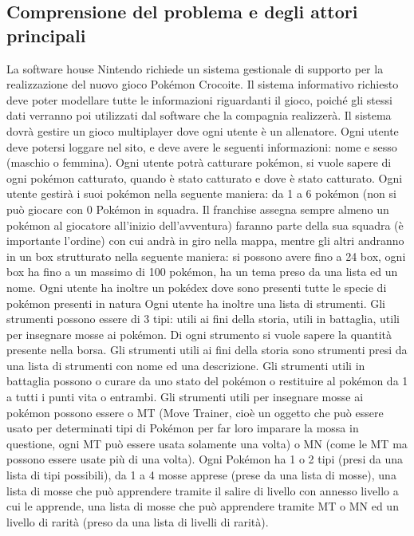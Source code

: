 \documentclass{article}
\begin{document}
\subsection{Comprensione del problema e degli attori principali}
La software house Nintendo richiede un sistema gestionale di supporto per la realizzazione del nuovo gioco Pokémon Crocoite. 
Il sistema informativo richiesto deve poter modellare tutte le informazioni riguardanti il gioco, poiché gli stessi dati verranno poi utilizzati dal software che la compagnia realizzerà. Il sistema dovrà gestire un gioco multiplayer dove ogni utente è un allenatore.
Ogni utente deve potersi loggare nel sito, e deve avere le seguenti informazioni: nome e sesso (maschio o femmina).
Ogni utente potrà catturare pokémon, si vuole sapere di ogni pokémon catturato, quando è stato catturato e dove è stato catturato.
Ogni utente gestirà i suoi pokémon nella seguente maniera:
da 1 a 6 pokémon (non si può giocare con 0 Pokémon in squadra. Il franchise assegna sempre almeno un pokémon al giocatore all’inizio dell’avventura) faranno parte della sua squadra (è importante l’ordine) con cui
andrà in giro nella mappa, mentre gli altri andranno in un box strutturato nella seguente maniera: si possono avere fino a 24 box, ogni box ha fino a un massimo di 100 pokémon, ha un tema preso da una lista ed un nome.
Ogni utente ha inoltre un pokédex dove sono presenti tutte le specie di pokémon presenti in natura
Ogni utente ha inoltre una lista di strumenti.
Gli strumenti possono essere di 3 tipi: utili ai fini della storia, utili in battaglia, utili per insegnare mosse ai pokémon.
Di ogni strumento si vuole sapere la quantità presente nella borsa.
Gli strumenti utili ai fini della storia sono strumenti presi da una lista di strumenti con nome ed una descrizione.
Gli strumenti utili in battaglia possono o curare da uno stato del pokémon o restituire al pokémon da 1 a tutti i punti vita o entrambi.
Gli strumenti utili per insegnare mosse ai pokémon possono essere o  MT (Move Trainer, cioè un oggetto che può essere usato per determinati tipi di Pokémon per far loro imparare la mossa in questione, ogni MT può essere usata solamente una volta) o MN (come le MT ma possono essere usate più di una volta).
Ogni Pokémon ha 1 o 2 tipi (presi da una lista di tipi possibili), da 1 a 4 mosse apprese (prese da una lista di mosse), una lista di mosse che può apprendere tramite il salire di livello con annesso livello a cui le apprende, una lista di mosse che può apprendere tramite MT o MN ed un livello di rarità (preso da una lista di livelli di rarità). 
\end{document}
